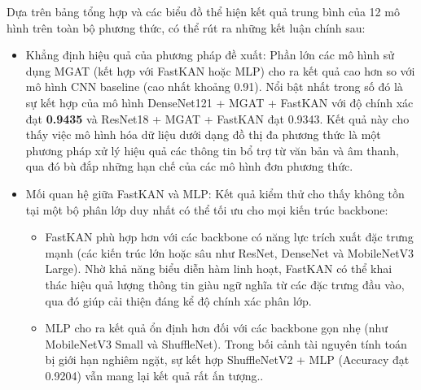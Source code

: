 \indent Dựa trên bảng tổng hợp và các biểu đồ thể hiện kết quả trung bình của 12 mô hình trên toàn bộ phương thức, có thể rút ra những kết luận chính sau:\vspace{-0.1cm}
\begin{itemize}[label={--}, itemsep=1pt]
    \item Khẳng định hiệu quả của phương pháp đề xuất: Phần lớn các mô hình sử dụng MGAT (kết hợp với FastKAN hoặc MLP) cho ra kết quả cao hơn so với mô hình CNN baseline (cao nhất khoảng 0.91). Nổi bật nhất trong số đó là sự kết hợp của mô hình DenseNet121 + MGAT + FastKAN với độ chính xác đạt \textbf{0.9435} và ResNet18 + MGAT + FastKAN đạt 0.9343. Kết quả này cho thấy việc mô hình hóa dữ liệu dưới dạng đồ thị đa phương thức là một phương pháp xử lý hiệu quả các thông tin bổ trợ từ văn bản và âm thanh, qua đó bù đắp những hạn chế của các mô hình đơn phương thức.
    \item Mối quan hệ giữa FastKAN và MLP: Kết quả kiểm thử cho thấy không tồn tại một bộ phân lớp duy nhất có thể tối ưu cho mọi kiến trúc backbone:
    \begin{itemize}[label={+}, itemsep=1pt]
        \item FastKAN phù hợp hơn với các backbone có năng lực trích xuất đặc trưng mạnh (các kiến trúc lớn hoặc sâu như ResNet, DenseNet và MobileNetV3 Large). Nhờ khả năng biểu diễn hàm linh hoạt, FastKAN có thể khai thác hiệu quả lượng thông tin giàu ngữ nghĩa từ các đặc trưng đầu vào, qua đó giúp cải thiện đáng kể độ chính xác phân lớp.
        \item MLP cho ra kết quả ổn định hơn đối với các backbone gọn nhẹ (như MobileNetV3 Small và ShuffleNet). Trong bối cảnh tài nguyên tính toán bị giới hạn nghiêm ngặt, sự kết hợp ShuffleNetV2 + MLP (Accuracy đạt 0.9204) vẫn mang lại kết quả rất ấn tượng..
    \end{itemize}
\end{itemize}